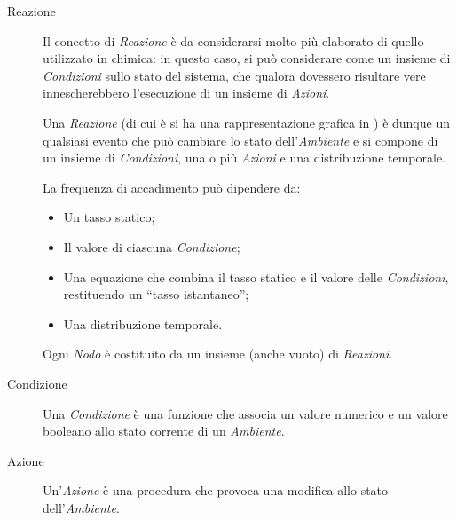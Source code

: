 \begin{description}
      \item[Reazione]\label{itm:react}
        Il concetto di \emph{Reazione} è da considerarsi molto più elaborato di quello utilizzato in chimica:
        in questo caso, si può considerare come un insieme di \emph{Condizioni} sullo stato del sistema, che qualora dovessero risultare vere innescherebbero l'esecuzione di un insieme di \emph{Azioni}.

        Una \emph{Reazione} (di cui è si ha una rappresentazione grafica in ) è dunque un qualsiasi evento che può cambiare lo stato dell'\emph{Ambiente} e si compone di un insieme di \emph{Condizioni}, una o più \emph{Azioni} e una distribuzione temporale.

        La frequenza di accadimento può dipendere da:
        \begin{itemize}
            \item Un tasso statico;
            \item Il valore di ciascuna \emph{Condizione};
            \item Una equazione che combina il tasso statico e il valore delle \emph{Condizioni}, restituendo un ``tasso istantaneo'';
            \item Una distribuzione temporale.
        \end{itemize}

        Ogni \emph{Nodo} è costituito da un insieme (anche vuoto) di \emph{Reazioni}.

      \item[Condizione]\label{itm:cond}
        Una \emph{Condizione} è una funzione che associa un valore numerico e un valore booleano allo stato corrente di un \emph{Ambiente}.

      \item[Azione]\label{itm:act}
        Un'\emph{Azione} è una procedura che provoca una modifica allo stato dell'\emph{Ambiente}.

      \end{description}


